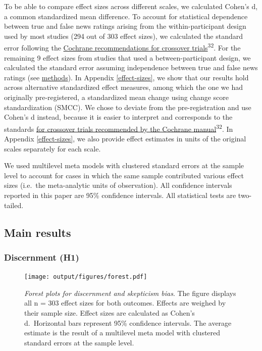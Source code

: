 \documentclass[
  doc,floatsintext]{apa6}
\begin{document}
To be able to compare effect sizes across different scales, we calculated Cohen's d, a common standardized mean difference. To account for statistical dependence between true and false news ratings arising from the within-participant design used by most studies (294 out of 303 effect sizes), we calculated the standard error following the \href{https://training.cochrane.org/handbook/current/chapter-23\#section-23-2-7-3}{Cochrane recommendations for crossover trials}\textsuperscript{32}. For the remaining 9 effect sizes from studies that used a between-participant design, we calculated the standard error assuming independence between true and false news ratings (see \hyperref[methods]{methods}). In Appendix \ref{effect-sizes}, we show that our results hold across alternative standardized effect measures, among which the one we had originally pre-registered, a standardized mean change using change score standardization (SMCC). We chose to deviate from the pre-registration and use Cohen's d instead, because it is easier to interpret and corresponds to the standards \href{https://training.cochrane.org/handbook/current/chapter-23\#section-23-2-7-3}{for crossover trials recommended by the Cochrane manual}\textsuperscript{32}. In Appendix \ref{effect-sizes}, we also provide effect estimates in units of the original scales separately for each scale.

We used multilevel meta models with clustered standard errors at the sample level to account for cases in which the same sample contributed various effect sizes (i.e.~the meta-analytic units of observation). All confidence intervals reported in this paper are 95\% confidence intervals. All statistical tests are two-tailed.

\subsection{Main results}\label{main-results}

\subsubsection{Discernment (H1)}\label{discernment-h1}



\begin{figure}
\centering
\texttt{[image: output/figures/forest.pdf]}
\caption{\label{fig:forest}\emph{Forest plots for discernment and skepticism bias}. The figure displays all n = 303 effect sizes for both outcomes. Effects are weighed by their sample size. Effect sizes are calculated as Cohen's d.~Horizontal bars represent 95\% confidence intervals. The average estimate is the result of a multilevel meta model with clustered standard errors at the sample level.}
\end{figure}
\end{document}
